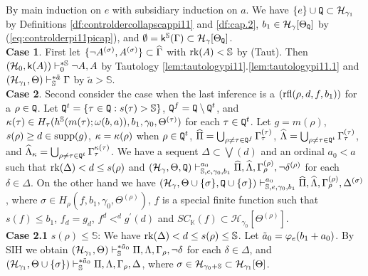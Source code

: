 \documentclass{article}
\newcommand{\mS}{\mathbb{S}}
\newcommand{\mK}{\mathbb{K}}
\begin{document}
\elem
\bprf 
By main induction on $e$  with subsidiary induction on $a$.
We have $\{e\}\cup{\tt Q}\subset{\cal H}_{\gamma_{1}}$ by 
Definitions \ref{df:controldercollapscappi11} and \ref{df:cap.2}, $b_{1}\in{\cal H}_{\gamma}[\Theta_{{\tt Q}}]$
by (\ref{eq:controlderpi11picap}), 
and
$\emptyset=\sfk^{\mS}(\Gam)\subset\calh_{\gam}[\Tht_{{\tt Q}}]$.
\\
\textbf{Case 1}.
First let $\{\lnot A^{(\sigma)},A^{(\sigma)}\}\subset\widehat{\Gamma}$ with
$\rk(A)<\mS$ by (Taut).
Then
$(\calh_{0},\sfk(A))\vdash^{* \mS}_{0}\lnot A,A$ by Tautology \ref{lem:tautologypi11}.\ref{lem:tautologypi11.1} and
$
(\mathcal{H}_{\gam_{1}},\Theta
)
\vdash^{* \tilde{a}}_{\mS}
\Gamma
$ by $\tilde{a}>\mS$.
\\
\textbf{Case 2}.
Second consider the case when the last inference is a $({\rm rfl}(\rho,d,f,b_{1}))$ for a $\rho\in{\tt Q}$.
Let ${\tt Q}^{t}=\{\tau\in{\tt Q}: s(\tau)>\mS\}$,
${\tt Q}^{f}={\tt Q}\setminus{\tt Q}^{t}$,
and
$\kappa(\tau)\in H_{\tau}(h^{\mS}(m(\tau);\ome(b,a)),b_{1},\gamma_{0},\Theta^{(\tau)})$
for each $\tau\in{\tt Q}^{t}$.
  Let $g=m(\rho)$, $s(\rho)\geq d\in {\rm supp}(g)$, $\kappa=\kappa(\rho)$ when $\rho\in{\tt Q}^{t}$,
  $\widehat{\Pi}=\bigcup_{\rho\neq\tau\in{\tt Q}^{f}}\Gamma_{\tau}^{(\tau)}$,
$\widehat{\Lambda}=\bigcup_{\rho\neq\tau\in{\tt Q}^{t}}\Gamma_{\tau}^{(\tau)}$, and
$\widehat{\Lambda}_{\kappa}=\bigcup_{\rho\neq\tau\in{\tt Q}^{t}}\Gamma_{\tau}^{\kappa(\tau)}$.
We have a sequent $\Delta\subset\bigvee(d)$
and an ordinal $a_{0}<a$ such that 
${\rm rk}(\Delta)<d\leq s(\rho)$ and
$
(\mathcal{H}_{\gamma},\Theta,
{\tt Q}
)
\vdash^{a_{0}}_{\mS,e,\gam_{0},b_{1}}
\widehat{\Pi},\widehat{\Lam},\Gamma_{\rho}^{(\rho)}, 
\lnot\delta^{(\rho)}
$
for each $\delta\in\Delta$.
On the other hand we have 
$
(\mathcal{H}_{\gamma},\Theta\cup\{\sig\},
{\tt Q}\cup\{\sigma\}
)
\vdash^{a_{0}}_{\mS,e,\gam_{0},b_{1}}
\widehat{\Pi},\widehat{\Lam},\Gamma_{\rho}^{(\rho)},  \Delta^{(\sigma)}
$, where
$\sigma\in H_{\rho}(f,b_{1},\gamma_{0},\Theta^{(\rho)})$,
$f$ is a special finite function such that $s(f)\leq b_{1}$,
$f_{d}=g_{d}$, $f^{d}<^{d}g^{\prime}(d)$ and
$SC_{\mK}(f)\subset\mathcal{H}_{\gamma_{0}}[\Theta^{(\rho)}]$.
\\
\textbf{Case 2.1} $s(\rho)\leq\mS$:
We have $\rk(\Del)<d\leq s(\rho)\leq\mS$.
Let $\tilde{a}_{0}=\varphi_{e}(b_{1}+a_{0})$.
By SIH we obtain
$
(\mathcal{H}_{\gam_{1}},\Theta
)
\vdash^{* \tilde{a}_{0}}_{\mS}
\Pi,\Lam,\Gam_{\rho},
\lnot\delta
$
for each $\delta\in\Delta$, and
$
(\mathcal{H}_{\gam_{1}},\Theta\cup\{\sig\}
)
\vdash^{* \tilde{a}_{0}}_{\mS}
\Pi,\Lam,\Gam_{\rho}, \Delta
$, where
$\sig\in\calh_{\gam_{0}+\mS}\subset\calh_{\gam_{1}}[\Tht]$.
\end{document}

